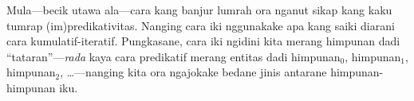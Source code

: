 \documentclass[../../../include/open-logic-section]{subfiles}
\begin{document}
Mula---becik utawa ala---cara kang banjur lumrah ora
nganut sikap kang kaku tumrap (im)\-pre\-di\-ka\-tiv\-itas. Nanging
cara iki nggunakake apa kang saiki diarani cara
kumulatif-iteratif. Pungkasane, cara iki ngidini kita
merang himpunan dadi ``tataran''---\emph{rada} kaya cara
predikatif merang entitas dadi himpunan$_0$, himpunan$_1$,
himpunan$_2$, \ldots---nanging kita ora ngajokake bedane jinis
antarane himpunan-himpunan iku.
\end{document}
